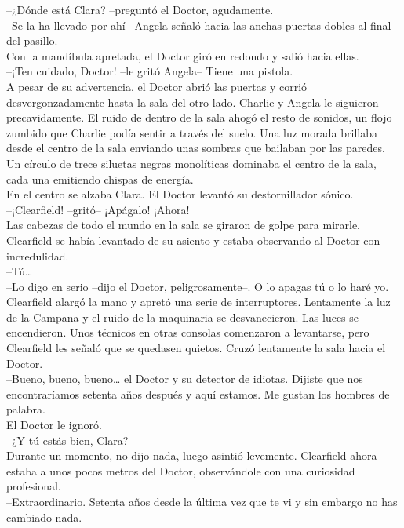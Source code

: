 --¿Dónde está Clara? --preguntó el Doctor, agudamente.\\
--Se la ha llevado por ahí --Angela señaló hacia las anchas puertas
dobles al final del pasillo.\\
Con la mandíbula apretada, el Doctor giró en redondo y salió hacia
ellas.\\
--¡Ten cuidado, Doctor! --le gritó Angela-- Tiene una pistola.\\
A pesar de su advertencia, el Doctor abrió las puertas y corrió
desvergonzadamente hasta la sala del otro lado. Charlie y Angela le
siguieron precavidamente. El ruido de dentro de la sala ahogó el resto
de sonidos, un flojo zumbido que Charlie podía sentir a través del
suelo. Una luz morada brillaba desde el centro de la sala enviando unas
sombras que bailaban por las paredes. Un círculo de trece siluetas
negras monolíticas dominaba el centro de la sala, cada una emitiendo
chispas de energía.\\
En el centro se alzaba Clara. El Doctor levantó su destornillador
sónico.\\
--¡Clearfield! --gritó-- ¡Apágalo! ¡Ahora!\\
Las cabezas de todo el mundo en la sala se giraron de golpe para
mirarle. Clearfield se había levantado de su asiento y estaba observando
al Doctor con incredulidad.\\
--Tú\ldots{}\\
--Lo digo en serio --dijo el Doctor, peligrosamente--. O lo apagas tú o
lo haré yo.\\
Clearfield alargó la mano y apretó una serie de interruptores.
Lentamente la luz de la Campana y el ruido de la maquinaria se
desvanecieron. Las luces se encendieron. Unos técnicos en otras consolas
comenzaron a levantarse, pero Clearfield les señaló que se quedasen
quietos. Cruzó lentamente la sala hacia el Doctor.\\
--Bueno, bueno, bueno\ldots{} el Doctor y su detector de idiotas.
Dijiste que nos encontraríamos setenta años después y aquí estamos. Me
gustan los hombres de palabra.\\
El Doctor le ignoró.\\
--¿Y tú estás bien, Clara?\\
Durante un momento, no dijo nada, luego asintió levemente. Clearfield
ahora estaba a unos pocos metros del Doctor, observándole con una
curiosidad profesional.\\
--Extraordinario. Setenta años desde la última vez que te vi y sin
embargo no has cambiado nada.\\
